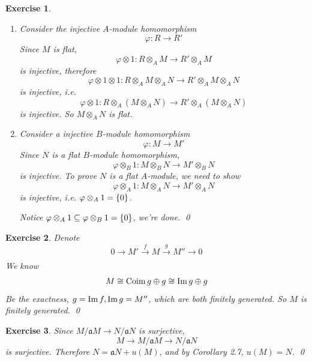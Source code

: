 \documentclass{article}
\theoremstyle{breakstyle}
\newtheorem{exercise}{Exercise}
\let\ker\relax
\DeclareMathOperator{\ker}{Ker}
\DeclareMathOperator{\coim}{Coim}
\DeclareMathOperator{\im}{Im}
\begin{document}
\begin{exercise}
    \leavevmode \vspace{-\baselineskip}
    \begin{enumerate}[label=({\roman*})]
        \item 
            Consider the injective $A$-module homomorphism
            $$
            \varphi:R\longrightarrow R'
            $$
            Since $M$ is flat,
            $$
            \varphi\otimes 1:R\otimes _{A}M\longrightarrow R'\otimes _{A}M
            $$
            is injective, therefore
            $$
            \varphi\otimes 1\otimes 1:R\otimes _{A}M\otimes _{A}N\longrightarrow R'\otimes _{A}M\otimes _{A}N
            $$
            is injective, i.e.
            $$
            \varphi\otimes 1:R\otimes _{A}(M\otimes _{A}N)\longrightarrow R'\otimes _{A}(M\otimes _{A}N)
            $$
            is injective.
            So $M\otimes _{A}N$ is flat.
        \item 
            Consider a injective $B$-module homomorphism
            $$
            \varphi:M\longrightarrow M'
            $$
            Since $N$ is a flat $B$-module homomorphism,
            $$
            \varphi\otimes _{B}1:M\otimes _{B}N\longrightarrow M'\otimes _{B}N
            $$
            is injective.
            To prove $N$ is a flat $A$-module, we need to show
            $$
            \varphi\otimes _{A}1:M\otimes _{A}N\longrightarrow M' \otimes _{A}N
            $$
            is injective, i.e. $\ker{\varphi\otimes _{A}1}=\left\{ 0 \right\} $.

            Notice $\ker{\varphi\otimes _{A}1}\subseteq \ker{\varphi\otimes _{B}1}= \left\{ 0 \right\} $, we're done.
            \qed
    \end{enumerate}
\end{exercise}

\begin{exercise}
    Denote
    $$
    0\rightarrow M'\xrightarrow[]{f} M\xrightarrow[]{g} M''\longrightarrow 0
    $$
    We know
    $$
    M\cong \coim{g}\oplus\ker{g}\cong \im{g}\oplus\ker{g}
    $$
    Be the exactness, $\ker{g}=\im{f},\im{g}=M''$, which are both finitely generated.
    So $M$ is finitely generated.
    \qed
\end{exercise}

\begin{exercise}
    Since $M / \mathfrak{a}M\longrightarrow N / \mathfrak{a}N$ is surjective,
    $$
    M\longrightarrow M / \mathfrak{a}M\longrightarrow N / \mathfrak{a}N
    $$
    is surjective.
    Therefore $N=\mathfrak{a}N+u(M)$, and by \emph{Corollary 2.7}, $u(M)=N$.
    \qed
\end{exercise}
\end{document}
